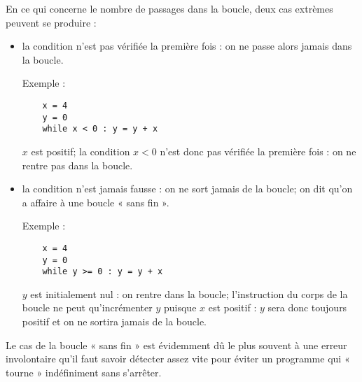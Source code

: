 En ce qui concerne le nombre de passages dans la boucle, deux cas extrèmes peuvent se produire : 
\begin{itemize}
\item la condition n'est pas vérifiée la première fois : 
	on ne passe alors jamais dans la boucle.
	
	Exemple : 
	\begin{py}{5cm}
	\begin{verbatim}
	x = 4
	y = 0
	while x < 0 : y = y + x
	\end{verbatim}
	\end{py}\hfill
	\begin{minipage}[t]{7.5cm}\footnotesize
	$x$ est positif; la condition $x < 0$ n'est donc pas vérifiée la première
	fois : on ne rentre pas dans la boucle.
	\end{minipage}
\item la condition n'est jamais fausse : on ne sort jamais de la boucle; 
	on dit qu'on a affaire à une boucle « sans fin ».

	Exemple : 
	\begin{py}{5cm}
	\begin{verbatim}
	x = 4
	y = 0
	while y >= 0 : y = y + x
	\end{verbatim}
	\end{py}\hfill
	\begin{minipage}[t]{7.5cm}\footnotesize
	$y$ est initialement nul : on rentre dans la boucle;
	l'instruction du corps de la boucle ne peut qu'incrémenter $y$
	puisque $x$ est positif : $y$ sera donc toujours positif et on 
	ne sortira jamais de la boucle.
	\end{minipage}
\end{itemize}
Le cas de la boucle « sans fin » est évidemment dû le plus souvent à une erreur involontaire
qu'il faut savoir détecter assez vite pour éviter un programme qui « tourne » indéfiniment
sans s'arrêter.


